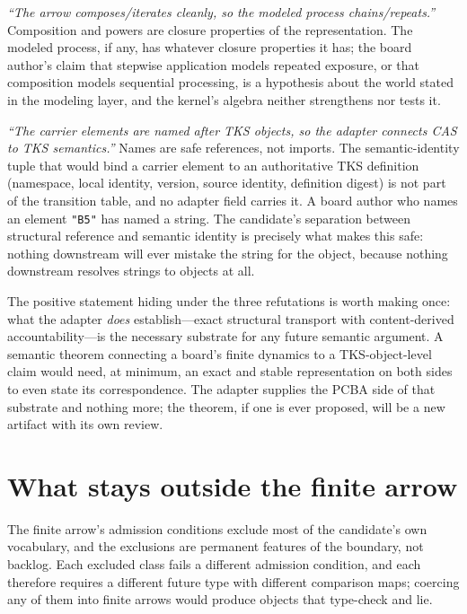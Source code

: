 \emph{``The arrow composes/iterates cleanly, so the modeled process chains/repeats.''} Composition and powers are closure properties of the representation. The modeled process, if any, has whatever closure properties it has; the board author's claim that stepwise application models repeated exposure, or that composition models sequential processing, is a hypothesis about the world stated in the modeling layer, and the kernel's algebra neither strengthens nor tests it.

\emph{``The carrier elements are named after TKS objects, so the adapter connects CAS to TKS semantics.''} Names are safe references, not imports. The semantic-identity tuple that would bind a carrier element to an authoritative TKS definition (namespace, local identity, version, source identity, definition digest) is not part of the transition table, and no adapter field carries it. A board author who names an element \texttt{"B5"} has named a string. The candidate's separation between structural reference and semantic identity is precisely what makes this safe: nothing downstream will ever mistake the string for the object, because nothing downstream resolves strings to objects at all.

The positive statement hiding under the three refutations is worth making once: what the adapter \emph{does} establish---exact structural transport with content-derived accountability---is the necessary substrate for any future semantic argument. A semantic theorem connecting a board's finite dynamics to a TKS-object-level claim would need, at minimum, an exact and stable representation on both sides to even state its correspondence. The adapter supplies the PCBA side of that substrate and nothing more; the theorem, if one is ever proposed, will be a new artifact with its own review.

\section{What stays outside the finite arrow}\label{ch09:sec:outside}

The finite arrow's admission conditions exclude most of the candidate's own vocabulary, and the exclusions are permanent features of the boundary, not backlog. Each excluded class fails a different admission condition, and each therefore requires a different future type with different comparison maps; coercing any of them into finite arrows would produce objects that type-check and lie.

